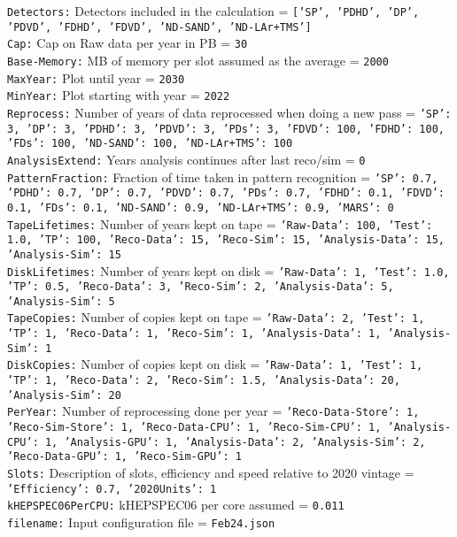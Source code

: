 {\tt Detectors:} Detectors included in the calculation = {\tt ['SP', 'PDHD', 'DP', 'PDVD', 'FDHD', 'FDVD', 'ND-SAND', 'ND-LAr+TMS']} \\
{\tt Cap:} Cap on Raw data per year in PB = {\tt 30} \\
{\tt Base-Memory:} MB of memory per slot assumed as the average = {\tt 2000} \\
{\tt MaxYear:} Plot until year = {\tt 2030} \\
{\tt MinYear:} Plot starting with year = {\tt 2022} \\
{\tt Reprocess:} Number of years of data reprocessed when doing a new pass = {\tt {'SP': 3, 'DP': 3, 'PDHD': 3, 'PDVD': 3, 'PDs': 3, 'FDVD': 100, 'FDHD': 100, 'FDs': 100, 'ND-SAND': 100, 'ND-LAr+TMS': 100}} \\
{\tt AnalysisExtend:} Years analysis continues after last reco/sim = {\tt 0} \\
{\tt PatternFraction:} Fraction of time taken in pattern recognition = {\tt {'SP': 0.7, 'PDHD': 0.7, 'DP': 0.7, 'PDVD': 0.7, 'PDs': 0.7, 'FDHD': 0.1, 'FDVD': 0.1, 'FDs': 0.1, 'ND-SAND': 0.9, 'ND-LAr+TMS': 0.9, 'MARS': 0}} \\
{\tt TapeLifetimes:} Number of years kept on tape = {\tt {'Raw-Data': 100, 'Test': 1.0, 'TP': 100, 'Reco-Data': 15, 'Reco-Sim': 15, 'Analysis-Data': 15, 'Analysis-Sim': 15}} \\
{\tt DiskLifetimes:} Number of years kept on disk = {\tt {'Raw-Data': 1, 'Test': 1.0, 'TP': 0.5, 'Reco-Data': 3, 'Reco-Sim': 2, 'Analysis-Data': 5, 'Analysis-Sim': 5}} \\
{\tt TapeCopies:} Number of copies kept on tape = {\tt {'Raw-Data': 2, 'Test': 1, 'TP': 1, 'Reco-Data': 1, 'Reco-Sim': 1, 'Analysis-Data': 1, 'Analysis-Sim': 1}} \\
{\tt DiskCopies:} Number of copies kept on disk = {\tt {'Raw-Data': 1, 'Test': 1, 'TP': 1, 'Reco-Data': 2, 'Reco-Sim': 1.5, 'Analysis-Data': 20, 'Analysis-Sim': 20}} \\
{\tt PerYear:} Number of reprocessing done per year = {\tt {'Reco-Data-Store': 1, 'Reco-Sim-Store': 1, 'Reco-Data-CPU': 1, 'Reco-Sim-CPU': 1, 'Analysis-CPU': 1, 'Analysis-GPU': 1, 'Analysis-Data': 2, 'Analysis-Sim': 2, 'Reco-Data-GPU': 1, 'Reco-Sim-GPU': 1}} \\
{\tt Slots:} Description of slots, efficiency and speed relative to 2020 vintage = {\tt {'Efficiency': 0.7, '2020Units': 1}} \\
{\tt kHEPSPEC06PerCPU:} kHEPSPEC06 per core assumed = {\tt 0.011} \\
{\tt filename:} Input configuration file = {\tt Feb24.json} \\
